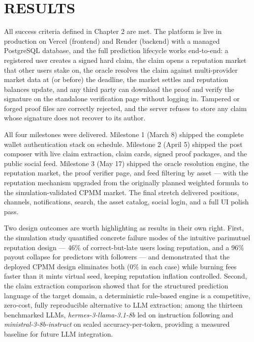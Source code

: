 \documentclass[a4paper,12pt]{report}
\begin{document}
\chapter{RESULTS}

All success criteria defined in Chapter 2 are met. The platform is live in production on Vercel (frontend) and Render (backend) with a managed PostgreSQL database, and the full prediction lifecycle works end-to-end: a registered user creates a signed hard claim, the claim opens a reputation market that other users stake on, the oracle resolves the claim against multi-provider market data at (or before) the deadline, the market settles and reputation balances update, and any third party can download the proof and verify the signature on the standalone verification page without logging in. Tampered or forged proof files are correctly rejected, and the server refuses to store any claim whose signature does not recover to its author.

All four milestones were delivered. Milestone 1 (March 8) shipped the complete wallet authentication stack on schedule. Milestone 2 (April 5) shipped the post composer with live claim extraction, claim cards, signed proof packages, and the public social feed. Milestone 3 (May 17) shipped the oracle resolution engine, the reputation market, the proof verifier page, and feed filtering by asset --- with the reputation mechanism upgraded from the originally planned weighted formula to the simulation-validated CPMM market. The final stretch delivered positions, channels, notifications, search, the asset catalog, social login, and a full UI polish pass.

Two design outcomes are worth highlighting as results in their own right. First, the simulation study quantified concrete failure modes of the intuitive parimutuel reputation design --- 46\% of correct-but-late users losing reputation, and a 96\% payout collapse for predictors with followers --- and demonstrated that the deployed CPMM design eliminates both (0\% in each case) while burning fees faster than it mints virtual seed, keeping reputation inflation controlled. Second, the claim extraction comparison showed that for the structured prediction language of the target domain, a deterministic rule-based engine is a competitive, zero-cost, fully reproducible alternative to LLM extraction; among the thirteen benchmarked LLMs, \textit{hermes-3-llama-3.1-8b} led on instruction following and \textit{ministral-3-8b-instruct} on scaled accuracy-per-token, providing a measured baseline for future LLM integration.
\end{document}
